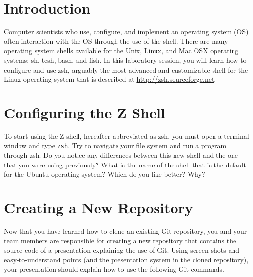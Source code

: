

\usepackage[compact]{titlesec}



\section*{Introduction}


Computer scientists who use, configure, and implement an operating system (OS) often interaction with the OS through the use of
the shell.  There are many operating system shells available for the Unix, Linux, and Mac OSX operating systems: sh, tcsh, bash,
and fish.  In this laboratory session, you will learn how to configure and use zsh, arguably the most advanced and customizable
shell for the Linux operating system that is described at \url{http://zsh.sourceforge.net}.

\section*{Configuring the Z Shell}

To start using the Z shell, hereafter abbreviated as zsh, you must open a terminal window and type {\tt zsh}.  Try to navigate
your file system and run a program through zsh.  Do you notice any differences between this new shell and the one that you were
using previously?  What is the name of the shell that is the default for the Ubuntu operating system? Which do you like better?
Why?

\section*{Creating a New Repository}

Now that you have learned how to clone an existing Git repository, you and your team members are responsible for
creating a new repository that contains the source code of a presentation explaining the use of Git. Using screen shots
and easy-to-understand points (and the presentation system in the cloned repository), your presentation should explain
how to use the following Git commands. 

